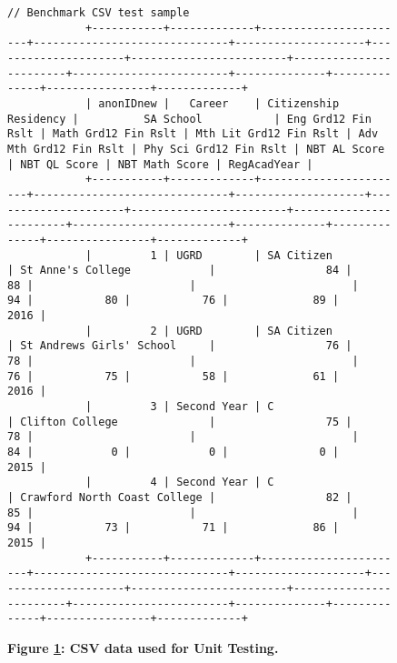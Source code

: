\begin{figure}[H]
\begin{mdframed}[rightline=false,leftline=false]
\begin{BVerbatim}[fontsize=\tiny]
            // Benchmark CSV test sample
            +-----------+-------------+-----------------------+------------------------------+--------------------+---------------------+------------------------+------------------------+------------------------+--------------+--------------+----------------+-------------+
            | anonIDnew |   Career    | Citizenship Residency |          SA School           | Eng Grd12 Fin Rslt | Math Grd12 Fin Rslt | Mth Lit Grd12 Fin Rslt | Adv Mth Grd12 Fin Rslt | Phy Sci Grd12 Fin Rslt | NBT AL Score | NBT QL Score | NBT Math Score | RegAcadYear |
            +-----------+-------------+-----------------------+------------------------------+--------------------+---------------------+------------------------+------------------------+------------------------+--------------+--------------+----------------+-------------+
            |         1 | UGRD        | SA Citizen            | St Anne's College            |                 84 |                  88 |                        |                        |                     94 |           80 |           76 |             89 |        2016 |
            |         2 | UGRD        | SA Citizen            | St Andrews Girls' School     |                 76 |                  78 |                        |                        |                     76 |           75 |           58 |             61 |        2016 |
            |         3 | Second Year | C                     | Clifton College              |                 75 |                  78 |                        |                        |                     84 |            0 |            0 |              0 |        2015 |
            |         4 | Second Year | C                     | Crawford North Coast College |                 82 |                  85 |                        |                        |                     94 |           73 |           71 |             86 |        2015 |
            +-----------+-------------+-----------------------+------------------------------+--------------------+---------------------+------------------------+------------------------+------------------------+--------------+--------------+----------------+-------------+

        \end{BVerbatim}
    \end{mdframed}
    \caption[CSVs for Unit Testing]{\textbf{Figure \ref{fig-sample-csv-files}: CSV data used for Unit Testing.}}
    \label{fig-sample-csv-files}
\end{figure}